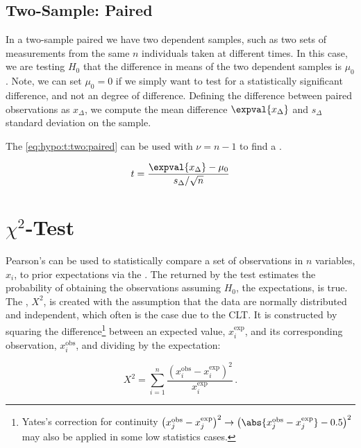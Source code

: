 \subsection{Two-Sample: Paired}
\label{hypo:t_test:two:paired}

In a two-sample paired \ttest we have two dependent samples,
such as two sets of measurements from the same $n$ individuals taken at different times.
In this case, we are testing $H_{0}$ that the difference in means of the two dependent samples is $\mu_{0}$.
Note, we can set $\mu_{0} = 0$ if we simply want to test for a statistically significant difference, and not an \apriori degree of difference.
Defining the difference between paired observations as $x_{\Delta}$, we compute the mean difference $\expval{x_{\Delta}}$ and $s_{\Delta}$ standard deviation on the sample.

The \tstat \cref{eq:hypo:t:two:paired} can be used with $\nu = n-1$ to find a \pvalue.

\begin{equation}\label{eq:hypo:t:two:paired}
t = \frac{\expval{x_{\Delta}} - \mu_{0}}{s_{\Delta} / \sqrt{n}}
\end{equation}

\section{\texorpdfstring{$\chi^{2}$-Test}{Chi-Squared Test}}
\label{hypo:chi2_test}

Pearson's \chiSqtest can be used to
statistically compare a set of observations in
$n$ variables, $x_{i}$, to prior expectations via the \chiSqdist.
The \pvalue returned by the test estimates the probability of obtaining the observations
assuming $H_{0}$, \ie the expectations, is true.
The \chiSqstat, $X^{2}$, is created with the assumption that
the data are normally distributed and independent,
which often is the case due to the CLT.
It is constructed by squaring the difference\footnote{Yates's
correction for continuity $\left(x^{\text{obs}}_{j} - x^{\text{exp}}_{j}\right)^{2} \to \left(\abs{x^{\text{obs}}_{j} - x^{\text{exp}}_{j}}-0.5\right)^{2}$ may
also be applied in some low statistics cases.} between
an expected value, $x^{\text{exp}}_{i}$, and its corresponding observation, $x^{\text{obs}}_{i}$,
and dividing by the expectation:

\begin{equation}\label{eq:hypo:chi2_statistic}
X^{2} = \sum_{i=1}^{n} \frac{\left(x^{\text{obs}}_{i} - x^{\text{exp}}_{i}\right)^{2}}{x^{\text{exp}}_{i}}\,.
\end{equation}

